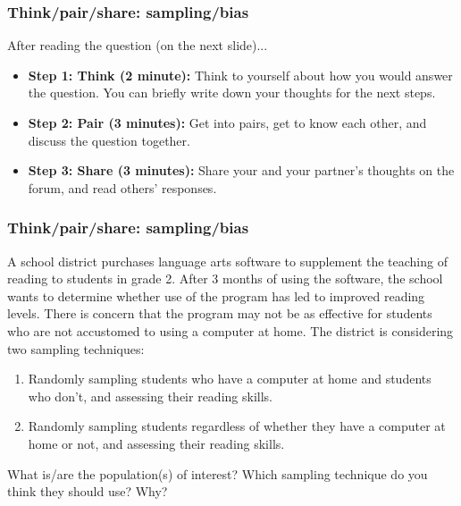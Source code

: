 \documentclass[slidestop,compress,mathserif]{beamer}
\begin{document}
\begin{frame}
	\frametitle{Think/pair/share: sampling/bias}

	After reading the question (on the next slide)...

	\begin{itemize}
		\item \textbf{Step 1: Think (2 minute):} Think to yourself about how you would answer the question. You can briefly write down your thoughts for the next steps.
		\item \textbf{Step 2: Pair (3 minutes):} Get into pairs, get to know each other, and discuss the question together. 
		\item \textbf{Step 3: Share (3 minutes):} Share your and your partner's thoughts on the forum, and read others' responses.
	\end{itemize}
\end{frame}

\begin{frame}
	\frametitle{Think/pair/share: sampling/bias}

	A school district purchases language arts software to supplement the teaching of reading to students in grade 2. 
	After 3 months of using the software, the school wants to determine whether use of the program has led to improved reading levels. 
	There is concern that the program may not be as effective for students who are not accustomed to using a computer at home. 
	The district is considering two sampling techniques:

	\begin{enumerate}
		\item Randomly sampling students who have a computer at home and students who don't, and assessing their reading skills. 
		\item Randomly sampling students regardless of whether they have a computer at home or not, and assessing their reading skills. 
	\end{enumerate}

	What is/are the population(s) of interest? Which sampling technique do you think they should use? Why?
\end{frame}

\end{document}
